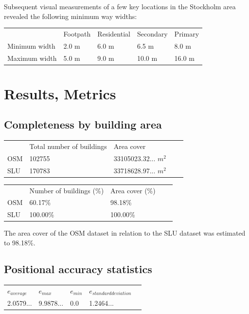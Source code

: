 \documentclass[a4paper]{article}
\begin{document}
Subsequent visual measurements of a few key locations in the Stockholm area revealed the following minimum way widths:
\begin{table}[H]
\begin{tabular}{lllll}
                  & Footpath & Residential & Secondary & Primary \\
    Minimum width & 2.0 m    & 6.0 m       & 6.5 m     & 8.0 m   \\
    Maximum width & 5.0 m    & 9.0 m       & 10.0 m    & 16.0 m
\end{tabular}
\end{table}

\section{Results, Metrics}

\subsection{Completeness by building area}

\begin{table}[H]
\begin{tabular}{lllll}
    & Total number of buildings & Area cover \\
    OSM & 102755 & 33105023.32... $m^2$ \\
    SLU & 170783 & 33718628.97... $m^2$
\end{tabular}
\end{table}

\begin{table}[H]
\begin{tabular}{lllll}
    & Number of buildings (\%) & Area cover (\%) \\
    OSM & 60.17\% & 98.18\% \\
    SLU & 100.00\% & 100.00\%
\end{tabular}
\end{table}

The area cover of the OSM dataset in relation to the SLU dataset was estimated to 98.18\%.

\subsection{Positional accuracy statistics}

\begin{table}[H]
\begin{tabular}{lllll}
    $e_{average}$ & $e_{max}$ & $e_{min}$ & $e_{standard deviation}$ \\
    2.0579... & 9.9878... & 0.0 & 1.2464...
\end{tabular}
\end{table}
\end{document}
